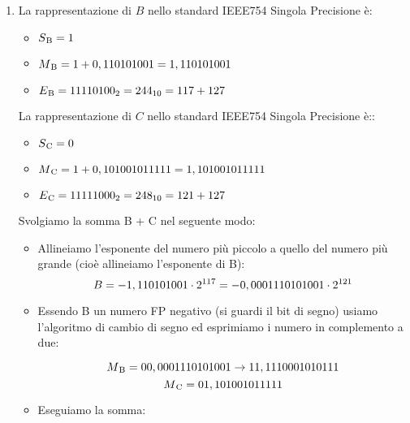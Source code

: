 \documentclass{article}
\begin{document}
\begin{enumerate}
    
    \item La rappresentazione di $B$ nello standard IEEE754 Singola Precisione è:
    \begin{itemize}
        \item[] $S\textsubscript{B}=1$
        \item[] $M\textsubscript{B}=1+0,110101001=1,110101001$
        \item[] $E\textsubscript{B}=11110100\textsubscript{2}=244\textsubscript{10}=117+127$
    \end{itemize}
    La rappresentazione di $C$ nello standard IEEE754 Singola Precisione è::
    \begin{itemize}
        \item[] $S\textsubscript{C}=0$
        \item[] $M\textsubscript{C}=1+0,101001011111=1,101001011111$
        \item[] $E\textsubscript{C}=11111000\textsubscript{2}=248\textsubscript{10}=121+127$
    \end{itemize}
        Svolgiamo la somma B + C nel seguente modo:
    \begin{itemize}
        \item Allineiamo l'esponente del numero pi\`u piccolo a quello del numero pi\`u grande (cio\`e allineiamo l'esponente di B):
        $$B=-1,110101001\cdot 2\textsuperscript{117}=-0,0001110101001\cdot 2\textsuperscript{121}$$
        \item Essendo B un numero FP negativo (si guardi il bit di segno) usiamo l'algoritmo di cambio di segno ed esprimiamo i numero in complemento a due:

$$M\textsubscript{B}=00,0001110101001 \rightarrow 11,1110001010111$$
$$M\textsubscript{C}=01,101001011111$$

        \item Eseguiamo la somma:
        \begin{center}
\end{center}
\end{itemize}
\end{enumerate}
\end{document}
